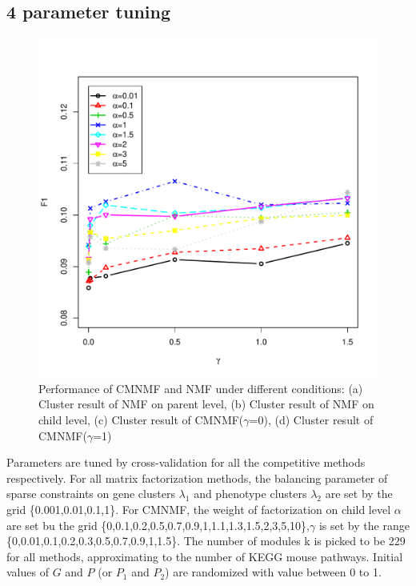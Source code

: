 \documentclass{bmcart}
\begin{document}
\subsection*{\textbf{4 parameter tuning}}
\begin{figure}[!h]
  \begin{minipage}[t]{0.8\linewidth}
    \includegraphics[width=\linewidth,origin = l]{DrawPictures/alpha-gamma.pdf}
  \end{minipage}
  \caption{Performance of CMNMF and NMF under different conditions: (a) Cluster result of NMF on parent level, (b) Cluster result of NMF on child level, (c) Cluster result of CMNMF($\gamma$=0), (d) Cluster result of CMNMF($\gamma$=1)}
  \label{fig:simulate_data}
\end{figure}
Parameters are tuned by cross-validation for all the competitive methods respectively. For all matrix factorization methods, the balancing parameter of sparse constraints on gene clusters $\lambda_1$ and phenotype clusters $\lambda_2$ are set by the grid \{0.001,0.01,0.1,1\}. For CMNMF, the weight of factorization on child level $\alpha$ are set bu the grid \{0,0.1,0.2,0.5,0.7,0.9,1,1.1,1.3,1.5,2,3,5,10\},$\gamma$ is set by the range \{0,0.01,0.1,0.2,0.3,0.5,0.7,0.9,1,1.5\}. The number of modules k is picked to be 229 for all methods, approximating to the number of KEGG mouse pathways. Initial values of $G$ and $P$ (or $P_1$ and $P_2$) are randomized with value between 0 to 1.
\end{document}
